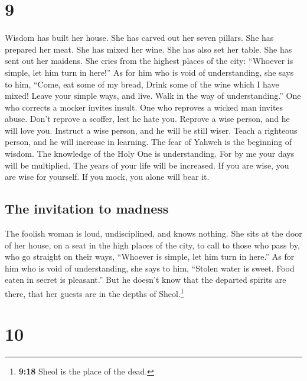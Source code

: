\hypertarget{section-8}{%
\section{9}\label{section-8}}

 Wisdom has built her house. She has carved out her seven
pillars.  She has prepared her meat. She has mixed her
wine. She has also set her table.  She has sent out her
maidens. She cries from the highest places of the city: 
``Whoever is simple, let him turn in here!'' As for him who is void of
understanding, she says to him,  ``Come, eat some of my
bread, Drink some of the wine which I have mixed!  Leave
your simple ways, and live. Walk in the way of understanding.''
 One who corrects a mocker invites insult. One who
reproves a wicked man invites abuse.  Don't reprove a
scoffer, lest he hate you. Reprove a wise person, and he will love you.
 Instruct a wise person, and he will be still wiser. Teach
a righteous person, and he will increase in learning. 
The fear of Yahweh is the beginning of wisdom. The knowledge of the Holy
One is understanding.  For by me your days will be
multiplied. The years of your life will be increased.  If
you are wise, you are wise for yourself. If you mock, you alone will
bear it.

\hypertarget{the-invitation-to-madness}{%
\subsection{The invitation to madness}\label{the-invitation-to-madness}}

 The foolish woman is loud, undisciplined, and knows
nothing.  She sits at the door of her house, on a seat in
the high places of the city,  to call to those who pass
by, who go straight on their ways,  ``Whoever is simple,
let him turn in here.'' As for him who is void of understanding, she
says to him,  ``Stolen water is sweet. Food eaten in
secret is pleasant.''  But he doesn't know that the
departed spirits are there, that her guests are in the depths of
Sheol.\footnote{\textbf{9:18} Sheol is the place of the dead.}

\hypertarget{section-9}{%
\section{10}\label{section-9}}

